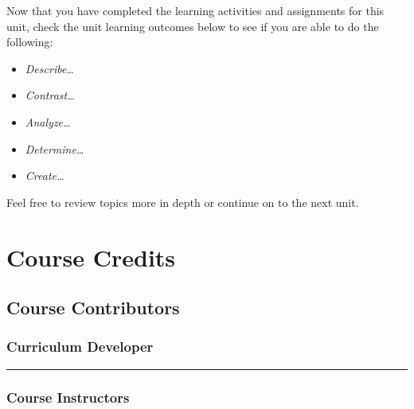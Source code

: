 \documentclass[
]{book}
\providecommand{\tightlist}{%
  \setlength{\itemsep}{0pt}\setlength{\parskip}{0pt}}
\begin{document}
\begin{progress}
Now that you have completed the learning activities and assignments for this unit, check the unit learning outcomes below to see if you are able to do the following:

\begin{itemize}
\tightlist
\item
  \emph{Describe\ldots{}}\\
\item
  \emph{Contrast\ldots{}}\\
\item
  \emph{Analyze\ldots{}}\\
\item
  \emph{Determine\ldots{}}\\
\item
  \emph{Create\ldots{}}
\end{itemize}

Feel free to review topics more in depth or continue on to the next unit.
\end{progress}

\hypertarget{course-credits}{%
\chapter*{Course Credits}\label{course-credits}}

\hypertarget{course-contributors}{%
\section*{Course Contributors}\label{course-contributors}}

\hypertarget{curriculum-developer}{%
\subsection*{Curriculum Developer}\label{curriculum-developer}}

\begin{center}\rule{0.5\linewidth}{0.5pt}\end{center}

\hypertarget{course-instructors}{%
\subsection*{Course Instructors}\label{course-instructors}}
\end{document}
